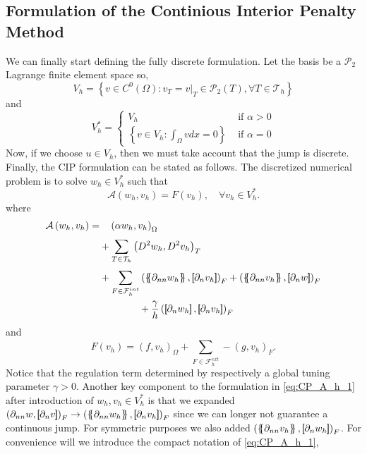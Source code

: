 \subsection{Formulation of the Continious Interior Penalty Method}%
\label{sub:formulation_of_continious_interior_penalty_method}


We can finally start defining the fully discrete formulation. Let the basis be a $\mathcal{P}_{2} $ Lagrange finite element space so,
\[
V_{h} = \left\{ v \in C^{0}\left( \Omega  \right): v_{T} = v | _{T} \in \mathcal{P} _{2}\left( T \right), \forall T \in
\mathcal{T}_{h}    \right\}
\]
and
\[
V_{h}^{*} = \begin{cases}
    V_{h} & \text{ if } \alpha  > 0 \\
    \left\{ v \in V_{h}: \int_{\Omega }^{} v dx   = 0   \right\} &  \text{ if } \alpha   = 0
\end{cases}
\]
Now, if we choose $u \in V_{h}$, then we must take account that the jump is discrete.
 Finally, the CIP formulation can be stated as follows.
The discretized numerical problem is to solve $w_{h} \in V_{h}^{*}$ such that
\begin{equation}
\label{eq:CP_A_F}
\mathcal{A}\left( w_{h}, v_{h} \right)   = F\left( v_{h} \right), \quad \forall v_{h} \in V_{h}^{*}  .
\end{equation}
where
\begin{equation}
\label{eq:CP_A_h_1}
\begin{split}
\mathcal{A} \left( w_{h}, v_{h} \right)   =&
  \quad  \left( \alpha  w_{h}, v_{h} \right) _{\Omega }\\
&  + \sum_{T \in \mathcal{T} _{h}}^{} \left( D^2 w_{h}, D^2v_{h} \right) _{T} \\
 & +
  \sum_{F \in \mathcal{F}_{h}^{int} }^{}
  \left( \mean{  \partial _{n n} w_{h} }, \jump{ \partial _{n }v_{h}} \right)_{F}  +
 \left( \mean{ \partial _{n n} v_{h} }, \jump{ \partial _{n}w }      \right)_{F} \\
& \quad \quad \quad \quad  + \frac{\gamma}{h}  \left( \jump{ \partial _{n} w_{h}}, \jump{ \partial _{n} v_{h}   }   \right)_{F}
\end{split}
\end{equation}
and
\begin{equation}
\label{eq:CP_F_h}
F\left( v_{h} \right)  = \left( f, v_{h} \right) _{\Omega } +  \sum_ {F \in \mathcal{F}_{h} ^{ext}}^{} - \left(g, v_{h}  \right) _{F}.
\end{equation}
Notice that the regulation term determined by respectively a global tuning parameter $\gamma >0 $. Another key component to the formulation
in \eqref{eq:CP_A_h_1} after introduction of $ w_{h}, v_{h} \in V^{*}_{h}$  is that we expanded $\left( \partial _{nn}w, \jump{ \partial _{n} v }  \right)_{F} \to \left( \mean{ \partial _{nn}w_{h} }  , \jump{ \partial _{n} v_{h} }  \right)_{F} $ since we can longer not guarantee a
continuous jump. For symmetric purposes we also added $ \left( \mean{ \partial _{nn} v_{h}}  , \jump{ \partial _{n} w_{h} }  \right)_{F} $. For convenience will we introduce the compact notation of \eqref{eq:CP_A_h_1},

